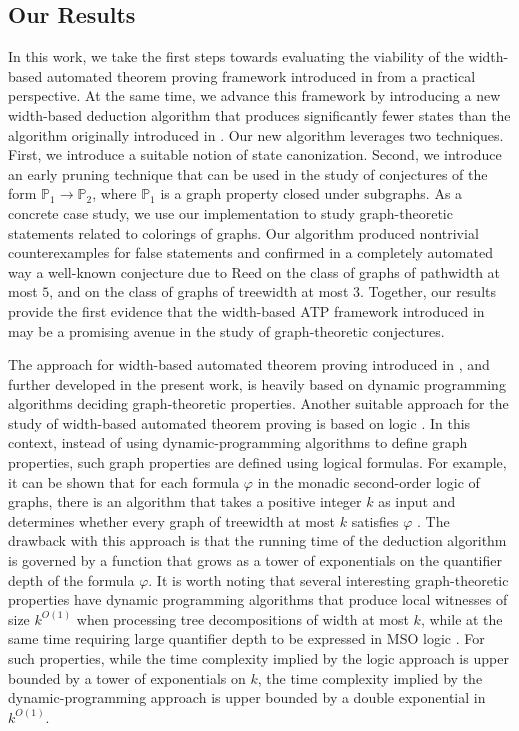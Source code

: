 \documentclass[11pt,a4paper]{article}
\newcommand{\graphproperty}{\mathbb{P}}
\begin{document}
\subsection{Our Results}

In this work, we take the first steps towards evaluating the viability of the width-based automated theorem proving framework introduced in \cite{de2023width} from a practical perspective. At the same time, we advance this framework by introducing a new width-based deduction algorithm that produces significantly fewer states than the algorithm originally introduced in \cite{de2023width}. Our new algorithm leverages two techniques. First, we introduce a suitable notion of state canonization. Second, we introduce an early pruning technique that can be used in the study of conjectures of the form $\graphproperty_1\rightarrow \graphproperty_2$, where $\graphproperty_1$ is a graph property closed under subgraphs. As a concrete case study, we use our implementation to
study graph-theoretic statements related to colorings of graphs. Our algorithm produced nontrivial counterexamples for false statements and confirmed in a completely automated way a well-known conjecture due to Reed \cite{reed1998omega} on the class of graphs of pathwidth at most $5$, and on the class of graphs of treewidth at most $3$.
Together, our results provide the first evidence that the width-based ATP framework introduced in \cite{de2023width} may be a promising avenue in the study of graph-theoretic conjectures.

The approach for width-based automated theorem proving introduced in \cite{de2023width}, and further developed in the present work, is heavily based on dynamic programming algorithms deciding graph-theoretic properties. Another suitable approach for the study of width-based automated theorem proving is based on logic \cite{courcelle1990monadic,seese1991structure,courcelle2012automata}. In this context, instead of using dynamic-programming algorithms to define graph properties, such graph properties are defined using logical formulas. For example, it can be shown that for each formula $\varphi$ in the monadic second-order logic of graphs, there is an algorithm that takes a positive integer $k$ as input and determines whether every graph of treewidth at most $k$ satisfies $\varphi$ \cite{seese1991structure,courcelle1990monadic}. The drawback with this approach is that the running time of the deduction algorithm is governed by a function that grows as a tower of exponentials on the quantifier depth of the formula $\varphi$. It is worth noting that several interesting graph-theoretic properties have dynamic programming algorithms that produce local witnesses of size $k^{O(1)}$ when processing tree decompositions of width at most $k$, while at the same time requiring large quantifier depth to be expressed in MSO logic \cite{de2023width}. For such properties, while the time complexity implied by the logic approach is upper bounded by a tower of exponentials on $k$, the time complexity implied by the dynamic-programming approach is upper bounded by a double exponential in $k^{O(1)}$.
\end{document}
